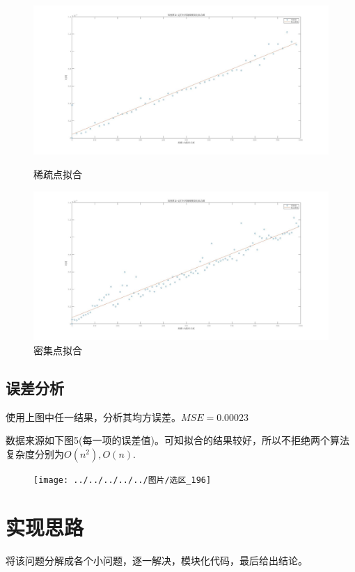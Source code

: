 \documentclass[UTF8]{ctexart}
\begin{document}
\begin{figure}[H]                 
	\centering
	\begin{minipage}[t]{1\textwidth}
		\centering
		\includegraphics[width=12cm]{3.jpg}
		\caption{稀疏点拟合}
	\end{minipage}
	\begin{minipage}[t]{1\textwidth}
		\centering
		\includegraphics[width=12cm]{4.jpg}
		\caption{密集点拟合}
	\end{minipage}
\end{figure}

\subsection{误差分析}
使用上图中任一结果，分析其均方误差。\( MSE = 0.00023 \)

数据来源如下图5(每一项的误差值)。可知拟合的结果较好，所以不拒绝两个算法复杂度分别为\( O(n^2),O(n) \).

\begin{figure}[H]
	\centering
	\texttt{[image: ../../../../../图片/选区\_196]}
	\caption{}
	\label{fig:196}
\end{figure}

\section{实现思路}
将该问题分解成各个小问题，逐一解决，模块化代码，最后给出结论。
\end{document}
